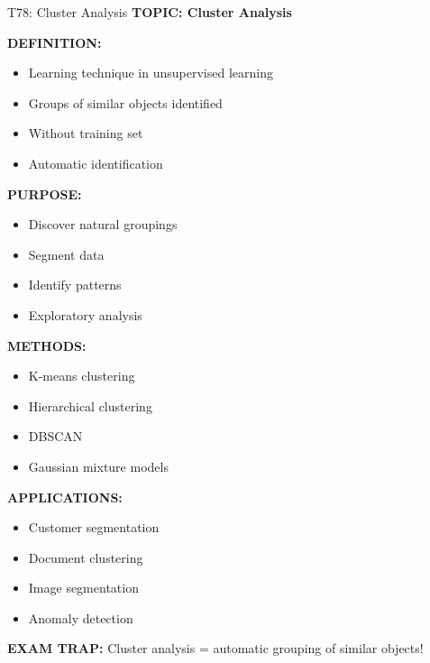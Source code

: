 \documentclass[8pt]{beamer}
\begin{document}
	\begin{frame}{T78: Cluster Analysis}
		\fontsize{6.5}{7.5}\selectfont
		\textbf{TOPIC: Cluster Analysis}
		
		\vspace{0.1cm}
		\textbf{DEFINITION:}
		\begin{itemize}
			\item Learning technique in unsupervised learning
			\item Groups of similar objects identified
			\item Without training set
			\item Automatic identification
		\end{itemize}
		
		\vspace{0.1cm}
		\textbf{PURPOSE:}
		\begin{itemize}
			\item Discover natural groupings
			\item Segment data
			\item Identify patterns
			\item Exploratory analysis
		\end{itemize}
		
		\vspace{0.1cm}
		\textbf{METHODS:}
		\begin{itemize}
			\item K-means clustering
			\item Hierarchical clustering
			\item DBSCAN
			\item Gaussian mixture models
		\end{itemize}
		
		\vspace{0.1cm}
		\textbf{APPLICATIONS:}
		\begin{itemize}
			\item Customer segmentation
			\item Document clustering
			\item Image segmentation
			\item Anomaly detection
		\end{itemize}
		
		\textcolor{myred}{\textbf{EXAM TRAP:}} Cluster analysis = \textcolor{myblue}{automatic grouping of similar objects}!
	\end{frame}
	
\end{document}
